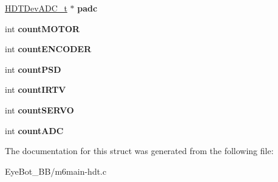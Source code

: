 \begin{DoxyCompactItemize}
\item 
\hypertarget{struct___h_d_t_dev_a_l_l__t_ac02b908ae1e859a6d1d686c7c9149556}{\hyperlink{struct___h_d_t_dev_a_d_c__t}{\-H\-D\-T\-Dev\-A\-D\-C\-\_\-t} $\ast$ {\bfseries padc}}\label{struct___h_d_t_dev_a_l_l__t_ac02b908ae1e859a6d1d686c7c9149556}

\item 
\hypertarget{struct___h_d_t_dev_a_l_l__t_a5da709d0f9db311ecb3bbfbccc8921d7}{int {\bfseries count\-M\-O\-T\-O\-R}}\label{struct___h_d_t_dev_a_l_l__t_a5da709d0f9db311ecb3bbfbccc8921d7}

\item 
\hypertarget{struct___h_d_t_dev_a_l_l__t_a9664acbd945b4878a896edbabeaff651}{int {\bfseries count\-E\-N\-C\-O\-D\-E\-R}}\label{struct___h_d_t_dev_a_l_l__t_a9664acbd945b4878a896edbabeaff651}

\item 
\hypertarget{struct___h_d_t_dev_a_l_l__t_ae2ae3e77b54bcd1c41bd4e36d7356ded}{int {\bfseries count\-P\-S\-D}}\label{struct___h_d_t_dev_a_l_l__t_ae2ae3e77b54bcd1c41bd4e36d7356ded}

\item 
\hypertarget{struct___h_d_t_dev_a_l_l__t_ae76f1b460e61f8d1d7b2d3b8ad5d043a}{int {\bfseries count\-I\-R\-T\-V}}\label{struct___h_d_t_dev_a_l_l__t_ae76f1b460e61f8d1d7b2d3b8ad5d043a}

\item 
\hypertarget{struct___h_d_t_dev_a_l_l__t_a8db27026e76195a6b737d38b02730bb2}{int {\bfseries count\-S\-E\-R\-V\-O}}\label{struct___h_d_t_dev_a_l_l__t_a8db27026e76195a6b737d38b02730bb2}

\item 
\hypertarget{struct___h_d_t_dev_a_l_l__t_a1a422c50073a355ea3567cb209aa8e7e}{int {\bfseries count\-A\-D\-C}}\label{struct___h_d_t_dev_a_l_l__t_a1a422c50073a355ea3567cb209aa8e7e}

\end{DoxyCompactItemize}


\-The documentation for this struct was generated from the following file\-:\begin{DoxyCompactItemize}
\item 
\-Eye\-Bot\-\_\-\-B\-B/m6main-\/hdt.\-c\end{DoxyCompactItemize}
